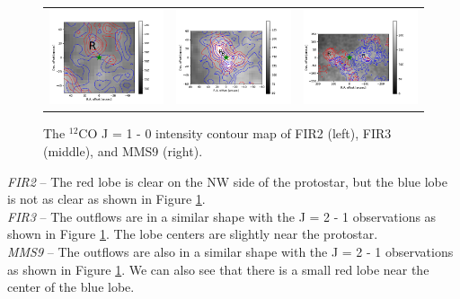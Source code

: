 \begin{figure}[h!]
	\begin{tabular}{ccc}
		\includegraphics[width = 5cm]{Orion_12CO_NRO_HOPS68_rbcontour_400} & 
		\includegraphics[width = 5cm]{Orion_12CO_NRO_HOPS370_rbcontour_400} & 
		\includegraphics[width = 5cm]{Orion_12CO_NRO_HOPS78_rbcontour_400}		
	\end{tabular}
	\caption{The $^{12}$CO J = 1 - 0 intensity contour map of FIR2 (left), FIR3 (middle), and MMS9 (right). }
	\label{fig:12COcontourmap}
\end{figure}

 
\noindent \textit{FIR2} -- The red lobe is clear on the NW side of the protostar, but the blue lobe is not as clear as shown in Figure \ref{fig:12COcontourmap}.\\
\textit{FIR3} -- The outflows are in a similar shape with the J = 2 - 1 observations as shown in Figure \ref{fig:12COcontourmap}. The lobe centers are slightly near the protostar.\\
\textit{MMS9} -- The outflows are also in a similar shape with the J = 2 - 1 observations as shown in Figure \ref{fig:12COcontourmap}. We can also see that there is a small red lobe near the center of the blue lobe.\\
\newpage

